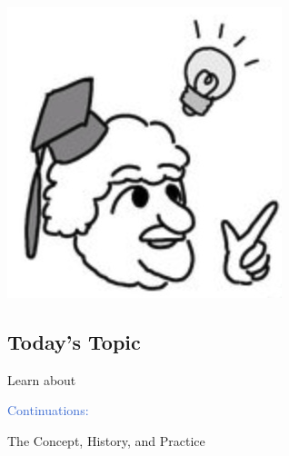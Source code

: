 \begin{frame}
	\hspace{-.03\linewidth}

	\vspace*{-.8\zw}
	\hspace*{.09\linewidth}\includegraphics[width=4\zw]{img/osiete2.png}
\end{frame}
\switchframetitle

\subsection{Today's Topic}
\begin{frame}[c]
	\frametitlesubs
	\semibf
	\centering

	{\Large Learn about}\pause

	\vspace*{11pt}


	{\huge {}\boldslant \textcolor{highlight}{Continuations:}}

	\vspace*{11pt}
	\LARGE
	The Concept, History, and Practice
\end{frame}
\switchfooter
{}




